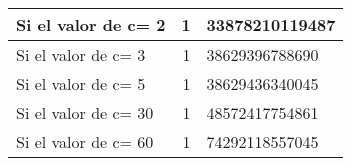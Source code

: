 
\begin{tabular}{|l | r@{,}l |}
\hline
Si el valor de c= 2  & 1  & 33878210119487  \\
\hline
Si el valor de c= 3   & 1 & 38629396788690  \\
\hline
Si el valor de c= 5  & 1  & 38629436340045 \\
\hline
Si el valor de c= 30   &1 & 48572417754861 \\
\hline
Si el valor de c= 60  & 1 & 74292118557045\\

\hline
\end{tabular}
\label{tab:1}
